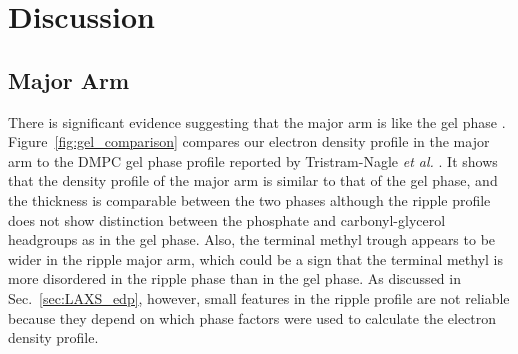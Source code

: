 \newpage
\section{Discussion}\label{sec:ripple_discussion}
\subsection{Major Arm}
There is significant evidence suggesting that the major arm is like 
the gel phase \cite{ref:Tardieu73,ref:Schneider83,ref:Sun96,ref:Riske09}. 
Figure~\ref{fig:gel_comparison} compares our electron density
profile in the major arm to the DMPC gel phase profile reported by 
Tristram-Nagle \textit{et al.} \cite{Tristram-Nagle02}. 
It shows that the density profile of the major arm is similar to that 
of the gel phase, and the thickness is comparable between the two phases
although the ripple profile does not show distinction
between the phosphate and carbonyl-glycerol headgroups as in the gel phase.
Also, the terminal methyl trough appears to be wider in the ripple major arm,
which could be a sign that the terminal methyl is more disordered
in the ripple phase than in the gel phase.
As discussed in
Sec.~\ref{sec:LAXS_edp}, however, small features in the ripple profile are not
reliable because they depend on which phase factors were used
to calculate the electron density profile.


